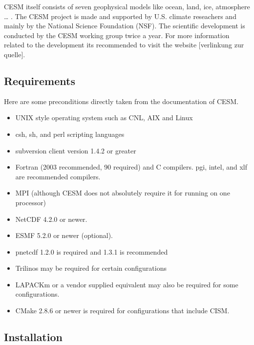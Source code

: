 \documentclass[]{article}
\providecommand{\tightlist}{%
  \setlength{\itemsep}{0pt}\setlength{\parskip}{0pt}}
\begin{document}
CESM itself consists of seven geophysical models like ocean, land, ice,
atmosphere \ldots{} . The CESM project is made and supported by U.S.
climate reseachers and mainly by the National Science Foundation (NSF).
The scientific development is conducted by the CESM working group twice
a year. For more information related to the development its recommended
to visit the website {[}verlinkung zur quelle{]}.

\subsection{Requirements}\label{requirements}

Here are some preconditions directly taken from the documentation of
CESM.

\begin{itemize}
\tightlist
\item
  UNIX style operating system such as CNL, AIX and Linux
\item
  csh, sh, and perl scripting languages
\item
  subversion client version 1.4.2 or greater
\item
  Fortran (2003 recommended, 90 required) and C compilers. pgi, intel,
  and xlf are recommended compilers.
\item
  MPI (although CESM does not absolutely require it for running on one
  processor)
\item
  NetCDF 4.2.0 or newer.
\item
  ESMF 5.2.0 or newer (optional).
\item
  pnetcdf 1.2.0 is required and 1.3.1 is recommended
\item
  Trilinos may be required for certain configurations
\item
  LAPACKm or a vendor supplied equivalent may also be required for some
  configurations.
\item
  CMake 2.8.6 or newer is required for configurations that include CISM.
\end{itemize}

\subsection{Installation}\label{installation-1}
\end{document}

